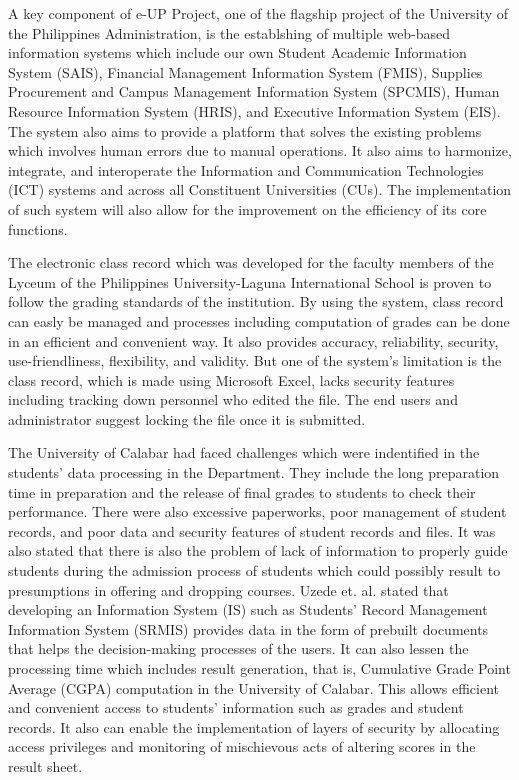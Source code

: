 \documentclass[11pt,a4paper,titlepage]{article}
\begin{document}
A key component of e-UP Project, one of the flagship project of the University of the Philippines Administration, is the establshing of multiple web-based information systems which include our own Student Academic Information System (SAIS), Financial Management Information System (FMIS), Supplies Procurement and Campus Management Information System (SPCMIS), Human Resource Information System (HRIS), and Executive Information System (EIS). The system also aims to provide a platform that solves the existing problems which involves human errors due to manual operations. It also aims to harmonize, integrate, and interoperate the Information and Communication Technologies (ICT) systems and across all Constituent Universities (CUs). The implementation of such system will also allow for the improvement on the efficiency of its core functions.  \cite{Caro} 

The electronic class record which was developed for the faculty members of the Lyceum of the Philippines University-Laguna International School is proven to follow the grading standards of the institution. By using the system, class record can easly be managed and processes including computation of grades can be done in an efficient and convenient way. It also provides accuracy, reliability, security, use-friendliness, flexibility, and validity. But one of the system's limitation is the class record, which is made using Microsoft Excel, lacks security features including tracking down personnel who edited the file. The end users and administrator suggest locking the file once it is submitted. \cite{Dellosa}

The University of Calabar had faced challenges which were indentified in the students' data processing in the Department. They include the long preparation time in preparation and the release of final grades to students to check their performance. There were also excessive paperworks, poor management of student records, and poor data and security features of student records and files. It was also stated that there is also the problem of lack of information to properly guide students during the admission process of students which could possibly result to presumptions in offering and dropping courses. Uzede et. al. stated that developing an Information System (IS) such as Students' Record Management Information System (SRMIS) provides data in the form of prebuilt documents that helps the decision-making processes of the users. It can also lessen the processing time which includes result generation, that is, Cumulative Grade Point Average (CGPA) computation in the University of Calabar. This allows efficient and convenient access to students' information such as grades and student records. It also can enable the implementation of layers of security by allocating access privileges and monitoring of mischievous acts of altering scores in the result sheet.\cite{Ude}
\end{document}
